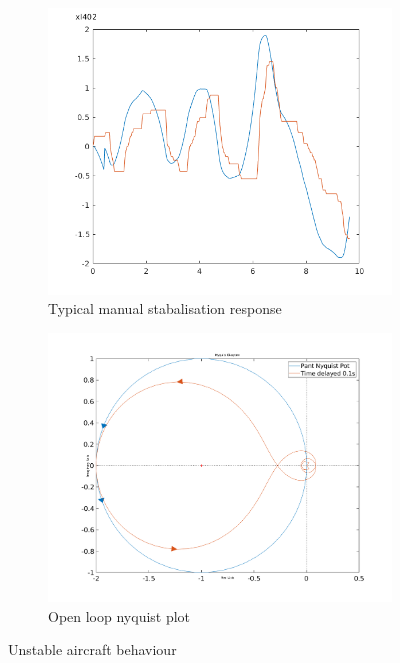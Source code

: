 \documentclass{article}
\begin{document}
\begin{figure}[htp]
\centering
\begin{subfigure}{.5\textwidth}
  \centering
  \includegraphics[width=\linewidth]{2_5_unstable_aircraft_response.png}
	\caption{Typical manual stabalisation response}
	\label{fig:unstable_response}
\end{subfigure}%
\begin{subfigure}{.5\textwidth}
  \centering
  \includegraphics[width=1.08\linewidth]{unstable_nyquist.png}
  \caption{Open loop nyquist plot}
  \label{fig:unstable_nyquist}
\end{subfigure}
\caption{Unstable aircraft behaviour}
\end{figure}
\end{document}
